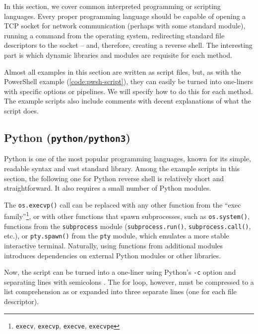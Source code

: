 In this section, we cover common interpreted programming or scripting languages. Every proper programming language should be capable of opening a TCP socket for network communication (perhaps with some standard module), running a command from the operating system, redirecting standard file descriptors to the socket -- and, therefore, creating a reverse shell. The interesting part is which dynamic libraries and modules are requisite for each method.

Almost all examples in this section are written as script files, but, as with the PowerShell example (\cref{code:pwsh-script}), they can easily be turned into one-liners with specific options or pipelines. We will specify how to do this for each method. The example scripts also include comments with decent explanations of what the script does.


\subsection{Python (\texttt{python/python3})}


Python is one of the most popular programming languages, known for its simple, readable syntax and vast standard library. Among the example scripts in this section, the following one for Python reverse shell is relatively short and straightforward. It also requires a small number of Python modules.


The \texttt{os.execvp()} call can be replaced with any other function from the ``exec family''\footnote{\texttt{execv}, \texttt{execvp}, \texttt{execve}, \texttt{execvpe}}, or with other functions that spawn subprocesses, such as \texttt{os.system()}, functions from the \texttt{subprocess} module (\texttt{subprocess.run()}, \texttt{subprocess.call()}, etc.), or \texttt{pty.spawn()} from the \texttt{pty} module, which emulates a more stable interactive terminal. Naturally, using functions from additional modules introduces dependencies on external Python modules or other libraries.


Now, the script can be turned into a one-liner using Python's \texttt{-c} option and separating lines with semicolons \cite{python-man}. The for loop, however, must be compressed to a list comprehension as  or expanded into three separate lines (one for each file descriptor).

